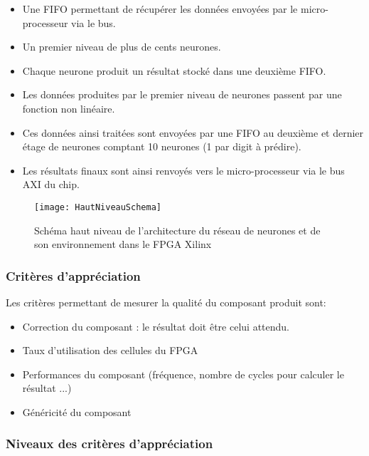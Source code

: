 \begin{itemize}
	\item Une FIFO permettant de récupérer les données envoyées par le micro-processeur via le bus.
	\item Un premier niveau de plus de cents neurones.
	\item Chaque neurone produit un résultat stocké dans une deuxième FIFO.
	\item Les données produites par le premier niveau de neurones passent par une fonction non linéaire.
	\item Ces données ainsi traitées sont envoyées par une FIFO au deuxième et dernier étage de neurones comptant 10 neurones (1 par digit à prédire).
	\item Les résultats finaux sont ainsi renvoyés vers le micro-processeur via le bus AXI du chip.
\end{itemize}
	

\begin{figure}[htbp]
\begin{center}
\texttt{[image: HautNiveauSchema]}
\caption{Schéma haut niveau de l'architecture du réseau de neurones et de son environnement dans le FPGA Xilinx}
\label{fig:HautNiveauSchema}
\end{center}
\end{figure}

\subsubsection{Critères d’appréciation}

Les critères permettant de mesurer la qualité du composant produit sont:
\begin{itemize}
	\item Correction du composant : le résultat doit être celui attendu.
	\item Taux d'utilisation des cellules du FPGA
	\item Performances du composant (fréquence, nombre de cycles pour
		calculer le résultat ...)
	\item Généricité du composant
\end{itemize}

\subsubsection{Niveaux des critères d’appréciation}

